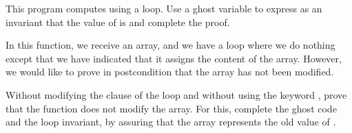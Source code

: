 




This program computes  using a loop. Use a ghost variable
 to express as an invariant that the value of 
is  and complete the proof.







In this function, we receive an array, and we have a loop where we do nothing
except that we have indicated that it assigns the content of the array. However,
we would like to prove in postcondition that the array has not been modified.





Without modifying the  clause of the loop and without using
the keyword , prove that the function does not
modify the array. For this, complete the ghost code and the loop invariant, by
assuring that the array  represents the old value of
.
